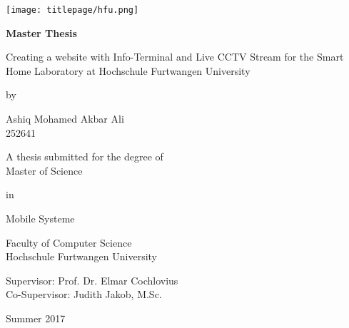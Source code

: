 \begin{titlepage}

\begin{flushright}
	\texttt{[image: titlepage/hfu.png]}
\end{flushright}
	
\begin{center}

	\vspace{1cm}
	\huge
	\textbf{Master Thesis}\\

	\vspace{1.25cm}
	\Large

	Creating a website with Info-Terminal and Live CCTV Stream for the Smart Home Laboratory at
	Hochschule Furtwangen University

	\vspace{0.75cm}
	by
	
	\vspace{0.75cm}
	Ashiq Mohamed Akbar Ali\\
	252641

	\vfill

	\large
	A thesis submitted for the degree of\\
	Master of Science

	\vspace{0.1cm}
	in

	\vspace{0.1cm}
	Mobile Systeme

	\vspace{0.5cm}
	Faculty of Computer Science\\
	Hochschule Furtwangen University

	\vspace{0.5cm}
	Supervisor: Prof. Dr. Elmar Cochlovius\\
	Co-Supervisor: Judith Jakob, M.Sc.

	\vspace{0.5cm}
	Summer 2017

	\end{center}
\end{titlepage}